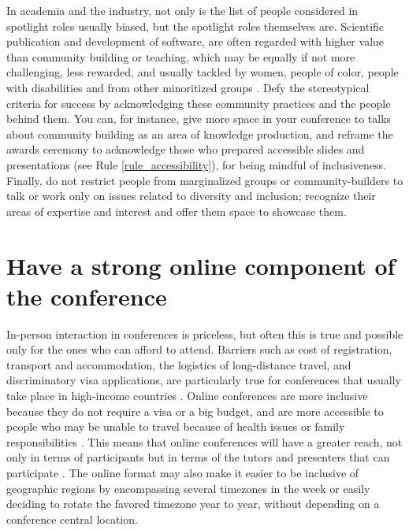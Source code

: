 \documentclass[10pt,letterpaper]{article}
\begin{document}
In academia and the industry, not only is the list of people considered in spotlight roles usually biased, but the spotlight roles themselves are.
Scientific publication and development of software, are often regarded with higher value than community building or teaching, which may be equally if not more challenging, less rewarded, and usually tackled by women, people of color, people with disabilities and from other minoritized groups \cite{cheng2020x+, burfordHomelinessMeantHaving2020}.
Defy the stereotypical criteria for success by acknowledging these community practices and the people behind them.
You can, for instance, give more space in your conference to talks about community building as an area of knowledge production, and reframe  the awards ceremony to acknowledge those who prepared accessible slides and presentations (see Rule \ref{rule_accessibility}), for being mindful of inclusiveness. 
Finally, do not restrict people from marginalized groups or community-builders to talk or work only on issues related to diversity and inclusion; recognize their areas of expertise and interest and offer them space to showcase them. 

\section{Have a strong online component of the conference} 
\label{rule_online}

In-person interaction in conferences is priceless, but often this is true and possible only for the ones who can afford to attend. 
Barriers such as cost of registration, transport and accommodation, the logistics of long-distance travel, and discriminatory visa applications, are particularly true for conferences that usually take place in high-income countries \cite{arendDisparityConferenceRegistration2019,gewinWhatScientistsShould2019,jooKeepOnlineOption2021}. 
Online conferences are more inclusive because they do not require a visa or a big budget, and are more accessible to people who may be unable to travel because of health issues or family responsibilities \cite{salibaGettingGripsOnline2020}.
This means that online conferences will have a greater reach, not only in terms of participants but in terms of the tutors and presenters that can participate \cite{atkinsonJournalMedicine20202021, roosOnlineConferencesNew2020, jooKeepOnlineOption2021}.
The online format may also make it easier to be inclusive of geographic regions by encompassing several timezones in the week or easily deciding to rotate the favored timezone year to year, without depending on a conference central location. 
\end{document}
